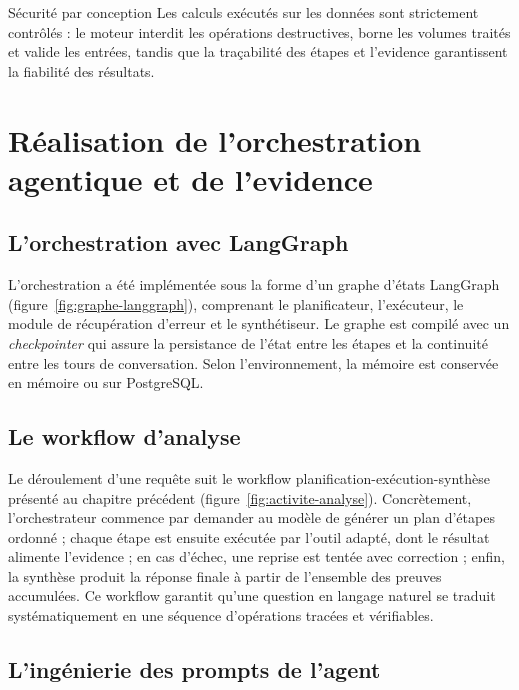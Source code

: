 \begin{infobox}{Sécurité par conception}
Les calculs exécutés sur les données sont strictement contrôlés : le moteur interdit les opérations destructives, borne les volumes traités et valide les entrées, tandis que la traçabilité des étapes et l'evidence garantissent la fiabilité des résultats.
\end{infobox}

\section{Réalisation de l'orchestration agentique et de l'evidence}

\subsection{L'orchestration avec LangGraph}

L'orchestration a été implémentée sous la forme d'un graphe d'états LangGraph (figure~\ref{fig:graphe-langgraph}), comprenant le planificateur, l'exécuteur, le module de récupération d'erreur et le synthétiseur. Le graphe est compilé avec un \textit{checkpointer} qui assure la persistance de l'état entre les étapes et la continuité entre les tours de conversation. Selon l'environnement, la mémoire est conservée en mémoire ou sur PostgreSQL.

\subsection{Le workflow d'analyse}

Le déroulement d'une requête suit le workflow planification-exécution-synthèse présenté au chapitre précédent (figure~\ref{fig:activite-analyse}). Concrètement, l'orchestrateur commence par demander au modèle de générer un plan d'étapes ordonné ; chaque étape est ensuite exécutée par l'outil adapté, dont le résultat alimente l'evidence ; en cas d'échec, une reprise est tentée avec correction ; enfin, la synthèse produit la réponse finale à partir de l'ensemble des preuves accumulées. Ce workflow garantit qu'une question en langage naturel se traduit systématiquement en une séquence d'opérations tracées et vérifiables.


\subsection{L'ingénierie des prompts de l'agent}

